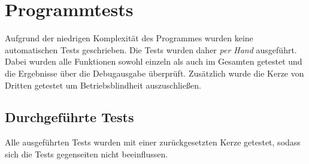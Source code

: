 \section{Programmtests}
    Aufgrund der niedrigen Komplexität des Programmes wurden keine automatischen
    Tests geschrieben. Die Tests wurden daher \textit{per Hand} ausgeführt.
    Dabei wurden alle Funktionen sowohl einzeln als auch im Gesamten getestet 
    und die Ergebnisse über die Debugausgabe überprüft. Zusätzlich wurde 
    die Kerze von Dritten getestet um Betriebsblindheit auszuschließen.

    \subsection{Durchgeführte Tests}
        Alle ausgeführten Tests wurden mit einer zurückgesetzten Kerze getestet,
        sodass sich die Tests gegenseiten nicht beeinflussen.

